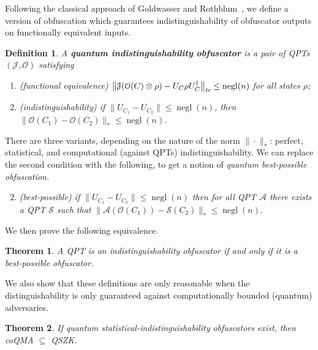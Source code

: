 \documentclass[11pt]{article}
\numberwithin{equation}{section}
\newtheorem{theorem}{Theorem}
\newtheorem{definition}{Definition}
\newcommand{\opn}{\operatorname}
\newcommand{\algo}{\mathcal}
\newcommand{\negl}{\opn{negl}}
\begin{document}
{Following the classical approach of Goldwasser and Rothblum~\cite{GR07}, we define a version of obfuscation which guarantees indistinguishability of obfuscator outputs on functionally equivalent inputs.
\begin{definition}\label{def:indistinguishability}
A \textbf{quantum indistinguishability obfuscator} is a pair of QPTs $(\algo J, \algo O)$ satisfying
\begin{enumerate}
\item (functional equivalence) $\bigl\| \algo J ( \algo O(C) \otimes \rho ) - U_C \rho U_C^\dagger \bigr\|_\emph{tr} \leq \negl(n)$ for all states $\rho$;
\item (indistinguishability) if $\|U_{C_1} - U_{C_2}\| \leq \negl(n)$, then $\|\mathcal O(C_1) - \mathcal O(C_2)\|_{*} \leq \negl(n)$.
\end{enumerate}
\end{definition}
\noindent There are three variants, depending on the nature of the norm $\| \cdot \|_{*}$: perfect, statistical, and computational (against QPTs) indistinguishability. We can replace the second condition with the following, to get a notion of \emph{quantum best-possible obfuscation.}
\begin{enumerate}
\setcounter{enumi}{1}
\item \emph{(best-possible) if $\|U_{C_1} - U_{C_2}\| \leq \negl(n)$ then for all QPT $\mathcal A$ there exists a QPT $\mathcal S$ such that}
$\| \mathcal A(\mathcal O(C_1)) - \mathcal S(C_2) \|_{*} \leq \negl(n)$.
\end{enumerate}
\noindent We then prove the following equivalence.

\begin{theorem}
A QPT is an indistinguishability obfuscator if and only if it is a best-possible obfuscator.
\end{theorem}

\noindent We also show that these definitions are only reasonable when the distinguishability is only guaranteed against computationally bounded (quantum) adversaries.

\begin{theorem}
If quantum statistical-indistinguishability obfuscators exist, then coQMA $\subseteq$ QSZK.
\end{theorem}

}
\end{document}
